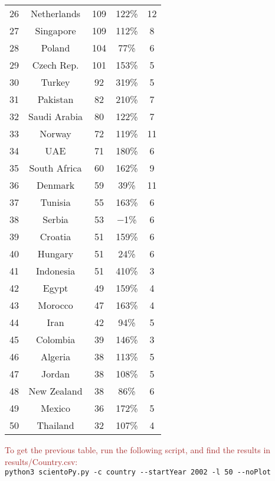 \documentclass[symmetry,article,accept,moreauthors,pdftex10pt,a4paper]{mdpi}
\begin{document}
\begin{table}[H]
\begin{tabular}{ccccc}
		26 & Netherlands & 109 & 122\% & 12 \\
		27 & Singapore & 109 & 112\% & 8\\
		28 & Poland & 104 & 77\% & 6\\
		29 & Czech Rep. & 101 & 153\% & 5\\
		30 & Turkey & 92 & 319\% & 5\\
		31 & Pakistan & 82 & 210\% & 7\\
		32 & Saudi Arabia & 80 & 122\% & 7 \\
		 33 & Norway & 72 & 119\% & 11\\
		34 & UAE & 71 & 180\% & 6\\
		35 & South Africa & 60 & 162\% & 9  \\
		 36 & Denmark & 59 & 39\% & 11 \\
		37 & Tunisia & 55 & 163\% & 6 \\
		38 & Serbia & 53 & $-$1\% & 6 \\
		39 & Croatia & 51 & 159\% & 6 \\
		40 & Hungary & 51 & 24\% & 6 \\
		41 & Indonesia & 51 & 410\% & 3 \\
		42 & Egypt & 49 & 159\% & 4 \\
		43 & Morocco & 47 & 163\% & 4 \\
		44 & Iran & 42 & 94\% & 5 \\
		45 & Colombia & 39 & 146\% & 3 \\
		46 & Algeria & 38 & 113\% & 5 \\
		47 & Jordan & 38 & 108\% & 5 \\
		48 & New Zealand & 38 & 86\% & 6 \\
		49 & Mexico & 36 & 172\% & 5 \\
		50 & Thailand & 32 & 107\% & 4 \\
		\bottomrule
	\end{tabular}
\end{table}

\noindent
\textcolor{brown}{To get the previous table, run the following script, and find the results in results/Country.csv:}\\
\hspace*{0.5cm}\verb|python3 scientoPy.py -c country --startYear 2002 -l 50 --noPlot|\\
\end{document}
